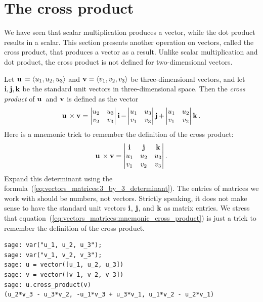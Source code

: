 
\section{The cross product}

We have seen that scalar multiplication produces a vector, while the
dot product results in a scalar. This section presents another
operation on vectors, called the cross product, that produces
a vector as a result. Unlike scalar multiplication and dot product,
the cross product is not defined for two-dimensional vectors.

Let $\operatorname*{\mathbf{u}}{} = \langle u_1, u_2, u_3 \rangle$ and
$\operatorname*{\mathbf{v}} = \langle v_1, v_2, v_3 \rangle$ be three-dimensional vectors,
and let $\operatorname*{\mathbf{i}}, \operatorname*{\mathbf{j}}, \operatorname*{\mathbf{k}}$ be the standard unit vectors in
three-dimensional space. Then the
\emph{cross product} of $\operatorname*{\mathbf{u}}{}$ and $\operatorname*{\mathbf{v}}$ is
defined as the vector
\[
\operatorname*{\mathbf{u}}{} \times \operatorname*{\mathbf{v}}
=
\begin{vmatrix}
u_2 & u_3 \\
v_2 & v_3
\end{vmatrix}
\operatorname*{\mathbf{i}}
-
\begin{vmatrix}
u_1 & u_3 \\
v_1 & v_3
\end{vmatrix}
\operatorname*{\mathbf{j}}
+
\begin{vmatrix}
u_1 & u_2 \\
v_1 & v_2
\end{vmatrix}
\operatorname*{\mathbf{k}}.
\]
Here is a mnemonic trick to remember the definition of the cross
product:
%
\begin{equation}
\label{eq:vectors_matrices:mnemonic_cross_product}
\operatorname*{\mathbf{u}}{} \times \operatorname*{\mathbf{v}}
=
\begin{vmatrix}
\operatorname*{\mathbf{i}} & \operatorname*{\mathbf{j}} & \operatorname*{\mathbf{k}} \\
u_1 & u_2 & u_3 \\
v_1 & v_2 & v_3
\end{vmatrix}.
\end{equation}
%
Expand this determinant using the
formula~(\ref{eq:vectors_matrices:3_by_3_determinant}). The entries of
matrices we work with should be numbers, not vectors. Strictly
speaking, it does not make sense to have the standard unit vectors
$\operatorname*{\mathbf{i}}$, $\operatorname*{\mathbf{j}}$, and $\operatorname*{\mathbf{k}}$ as matrix entries. We stress that
equation~(\ref{eq:vectors_matrices:mnemonic_cross_product}) is just a
trick to remember the definition of the cross product.

\begin{lstlisting}
sage: var("u_1, u_2, u_3");
sage: var("v_1, v_2, v_3");
sage: u = vector([u_1, u_2, u_3])
sage: v = vector([v_1, v_2, v_3])
sage: u.cross_product(v)
(u_2*v_3 - u_3*v_2, -u_1*v_3 + u_3*v_1, u_1*v_2 - u_2*v_1)
\end{lstlisting}

